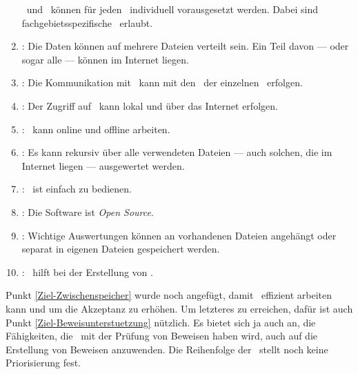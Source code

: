 \begin{enumerate}
	\Axiome\ und \Saetze\ können für jeden \Beweis\ individuell vorausgesetzt werden.
	Dabei sind fachgebietsspezifische \Fachbegriffe\ erlaubt.
	\item \label{Ziel-Internet} :
	Die Daten können auf mehrere Dateien verteilt sein.
	Ein Teil davon --- oder sogar alle --- können im Internet liegen.
	\item \label{Ziel-Kommunikation} :
	Die Kommunikation mit \ASBA\ kann mit den \Fachbegriffen\ der einzelnen \Fachgebiete\ erfolgen.
	\item \label{Ziel-Zugriff} :
	Der Zugriff auf \ASBA\ kann lokal und über das Internet erfolgen.
	\item \label{Ziel-Unabhaengigkeit} :
	\ASBA\ kann online und offline arbeiten.
	\item \label{Ziel-Rekursion} :
	Es kann rekursiv über alle verwendeten Dateien --- auch solchen, die im Internet liegen --- ausgewertet werden.
	\item \label{Ziel-Bedienbarkeit} :
	\ASBA\ ist einfach zu bedienen.
	\item \label{Ziel-Lizenz} :
	Die Software ist \emph{Open Source}.
	\item \label{Ziel-Zwischenspeicher} :
	Wichtige Auswertungen können an vorhandenen Dateien angehängt oder separat in eigenen Dateien gespeichert werden.
	\item \label{Ziel-Beweisunterstuetzung} :
	\ASBA\ hilft bei der Erstellung von \Beweisen.
\end{enumerate}
%
Punkt \ref{Ziel-Zwischenspeicher} wurde noch angefügt, damit \ASBA\ effizient arbeiten kann und um die Akzeptanz zu erhöhen.
Um letzteres zu erreichen, dafür ist auch Punkt \ref{Ziel-Beweisunterstuetzung} nützlich.
Es bietet sich ja auch an, die Fähigkeiten, die \ASBA\ mit der Prüfung von Beweisen haben wird, auch auf die Erstellung von Beweisen anzuwenden.
Die Reihenfolge der \Ziele\ stellt noch keine Priorisierung fest.

